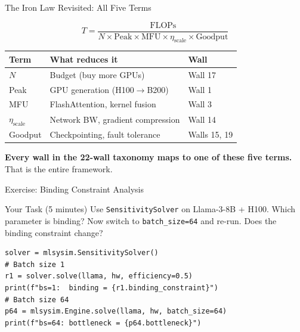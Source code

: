 \documentclass[aspectratio=169, 12pt]{beamer}
\begin{document}
\begin{frame}{The Iron Law Revisited: All Five Terms}
\begin{center}
\Large
\[
T = \frac{\text{FLOPs}}{N \times \text{Peak} \times \text{MFU} \times \eta_{\text{scale}} \times \text{Goodput}}
\]
\end{center}

\vspace{0.5em}
\centering
\begin{tabular}{lll}
\toprule
\textbf{Term} & \textbf{What reduces it} & \textbf{Wall} \\
\midrule
$N$                  & Budget (buy more GPUs)        & Wall 17 \\
Peak                 & GPU generation (H100$\to$B200)& Wall 1 \\
MFU                  & FlashAttention, kernel fusion  & Wall 3 \\
$\eta_{\text{scale}}$& Network BW, gradient compression & Wall 14 \\
Goodput              & Checkpointing, fault tolerance & Walls 15, 19 \\
\bottomrule
\end{tabular}

\vspace{0.5em}
\textbf{Every wall in the 22-wall taxonomy maps to one of these five terms.}\\
That is the entire framework.
\end{frame}

\begin{frame}[fragile]{Exercise: Binding Constraint Analysis}
\begin{alertblock}{Your Task (5 minutes)}
Use \texttt{SensitivitySolver} on Llama-3-8B + H100.
Which parameter is binding? Now switch to \texttt{batch\_size=64} and
re-run. Does the binding constraint change?
\end{alertblock}

\begin{lstlisting}
solver = mlsysim.SensitivitySolver()
# Batch size 1
r1 = solver.solve(llama, hw, efficiency=0.5)
print(f"bs=1:  binding = {r1.binding_constraint}")
# Batch size 64
p64 = mlsysim.Engine.solve(llama, hw, batch_size=64)
print(f"bs=64: bottleneck = {p64.bottleneck}")
\end{lstlisting}

\end{frame}
\end{document}
